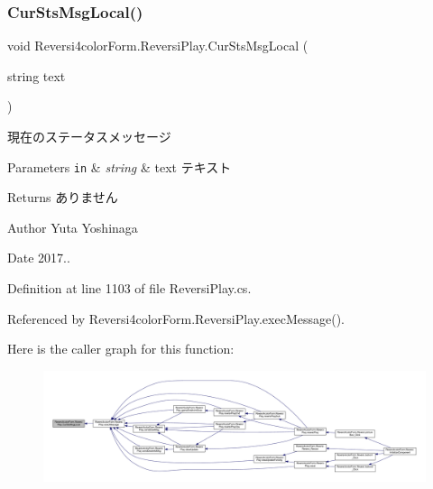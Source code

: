 \subsubsection{\texorpdfstring{Cur\+Sts\+Msg\+Local()}{CurStsMsgLocal()}}
{\footnotesize\ttfamily void Reversi4color\+Form.\+Reversi\+Play.\+Cur\+Sts\+Msg\+Local (\begin{DoxyParamCaption}\item[{string}]{text }\end{DoxyParamCaption})\hspace{0.3cm}{\ttfamily [private]}}



現在のステータスメッセージ 


\begin{DoxyParams}[1]{Parameters}
\mbox{\tt in}  & {\em string} & text テキスト \\
\hline
\end{DoxyParams}
\begin{DoxyReturn}{Returns}
ありません 
\end{DoxyReturn}
\begin{DoxyAuthor}{Author}
Yuta Yoshinaga 
\end{DoxyAuthor}
\begin{DoxyDate}{Date}
2017.. 
\end{DoxyDate}


Definition at line 1103 of file Reversi\+Play.\+cs.



Referenced by Reversi4color\+Form.\+Reversi\+Play.\+exec\+Message().

Here is the caller graph for this function\+:
\nopagebreak
\begin{figure}[H]
\begin{center}
\leavevmode
\includegraphics[width=350pt]{class_reversi4color_form_1_1_reversi_play_ada1cd7e7bcfaadc34f40a59aee12aa50_icgraph}
\end{center}
\end{figure}
\mbox{\label{class_reversi4color_form_1_1_reversi_play_aad21cdb2b475bc1d65ab32bca755f24f}} 
